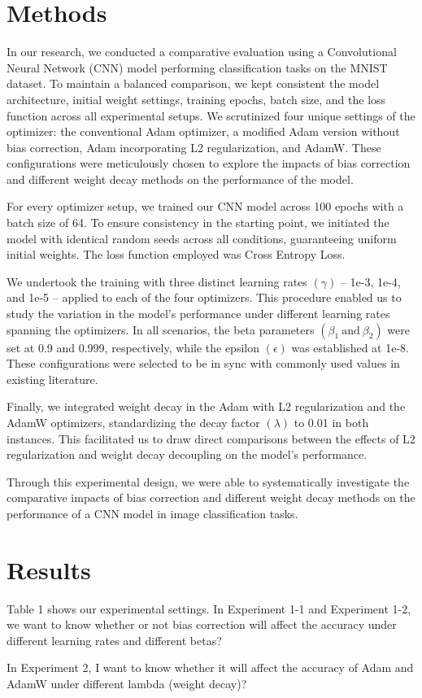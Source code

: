 \documentclass[14pt,twocolumn,letterpaper]{extarticle}
\begin{document}
\section{Methods}
In our research, we conducted a comparative evaluation using a Convolutional Neural Network (CNN) model performing classification tasks on the MNIST dataset. To maintain a balanced comparison, we kept consistent the model architecture, initial weight settings, training epochs, batch size, and the loss function across all experimental setups. We scrutinized four unique settings of the optimizer: the conventional Adam optimizer, a modified Adam version without bias correction, Adam incorporating L2 regularization, and AdamW. These configurations were meticulously chosen to explore the impacts of bias correction and different weight decay methods on the performance of the model.\par
For every optimizer setup, we trained our CNN model across 100 epochs with a batch size of 64. To ensure consistency in the starting point, we initiated the model with identical random seeds across all conditions, guaranteeing uniform initial weights. The loss function employed was Cross Entropy Loss.\par
We undertook the training with three distinct learning rates $\left(\gamma\right)$ – 1e-3, 1e-4, and 1e-5 – applied to each of the four optimizers. This procedure enabled us to study the variation in the model's performance under different learning rates spanning the optimizers. In all scenarios, the beta parameters $\left(\beta_{1}\ \text{and}\ \beta_{2}\right)$ were set at 0.9 and 0.999, respectively, while the epsilon $\left(\epsilon\right)$ was established at 1e-8. These configurations were selected to be in sync with commonly used values in existing literature.\par
Finally, we integrated weight decay in the Adam with L2 regularization and the AdamW optimizers, standardizing the decay factor $\left(\lambda\right)$ to 0.01 in both instances. This facilitated us to draw direct comparisons between the effects of L2 regularization and weight decay decoupling on the model's performance.\par
Through this experimental design, we were able to systematically investigate the comparative impacts of bias correction and different weight decay methods on the performance of a CNN model in image classification tasks.



\section{Results}
Table 1 shows our experimental settings. In Experiment 1-1 and Experiment 1-2, we want to know whether or not bias correction will affect the accuracy under different learning rates and different betas? \par In Experiment 2, I want to know whether it will affect the accuracy of Adam and AdamW under different lambda (weight decay)?
\end{document}
